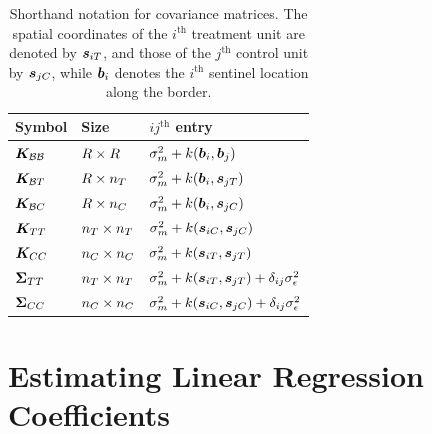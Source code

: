\begin{appendices}
\begin{table}[bp]
    \centering
    \bgroup
    \def\arraystretch{1.2}%
    \begin{tabular}{lll}
        \hline
        Symbol & Size                       & \(ij^{\mathrm{th}}\) entry                                                      \\ \hline
        \(\bm{K}_{\mathcal{B} \mathcal{B}}\) & \(R \times R\) & \(\sigmamu^2 + k\del{\sentinel_i,\sentinel_j}\)                                 \\ 
        \(\bm{K}_{\mathcal{B} T}\) & \(R \times n_T\) & \(\sigmamu^2 + k\del{\sentinel_i,\svec_{j\treat}}\)                             \\ 
        \(\bm{K}_{\mathcal{B} C}\) & \(R \times n_C\) & \(\sigmamu^2 + k\del{\sentinel_i,\svec_{j\ctrol}}\)                             \\
        \(\bm{K}_{T T}\) & \(n_T \times n_T\) & \(\sigmamu^2 + k\del{\svec_{i\ctrol},\svec_{j\ctrol}}\)                         \\
        \(\bm{K}_{C C}\) & \(n_C \times n_C\) & \(\sigmamu^2 + k\del{\svec_{i\treat},\svec_{j\treat}}\)                         \\ 
        \(\bm{\Sigma}_{T T}\) & \(n_T \times n_T\) & \(\sigmamu^2 + k\del{\svec_{i\treat},\svec_{j\treat}} + \delta_{ij} \sigman^2\) \\ 
        \(\bm{\Sigma}_{C C}\) & \(n_C \times n_C\) & \(\sigmamu^2 + k\del{\svec_{i\ctrol},\svec_{j\ctrol}} + \delta_{ij} \sigman^2\) \\
        \hline
    \end{tabular}
    \egroup
    \caption{
        Shorthand notation for covariance matrices. The spatial coordinates of the \(i^\mathrm{th}\) treatment unit are denoted by \(\bm{s}_{iT}\),
and those of the \(j^\mathrm{th}\) control unit by \(\bm{s}_{jC}\), while \(\bm{b}_i\) denotes the \(i^\mathrm{th}\) sentinel location along the border.
        \label{table:notation}
    }
\end{table}

\section{Estimating Linear Regression Coefficients}
\label{sec:betahat}


\end{appendices}
